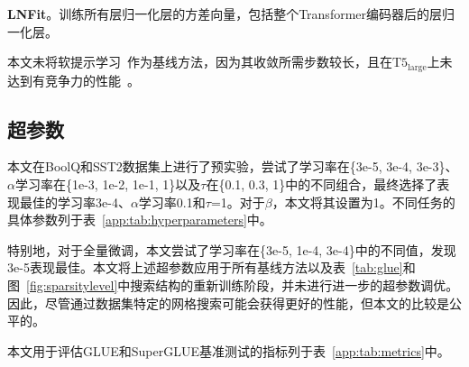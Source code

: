 \noindent\textbf{LNFit}。训练所有层归一化层的方差向量，包括整个Transformer编码器后的层归一化层。

本文未将软提示学习~\cite{lester2021power}作为基线方法，因为其收敛所需步数较长，且在$\text{T}5_{\text{large}}$上未达到有竞争力的性能~\cite{lester2021power}。


\subsection{超参数}
\label{app:hyperparameters}
本文在BoolQ和SST2数据集上进行了预实验，尝试了学习率在\{3e-5, 3e-4, 3e-3\}、$\alpha$学习率在\{1e-3, 1e-2, 1e-1, 1\}以及$\tau$在\{0.1, 0.3, 1\}中的不同组合，最终选择了表现最佳的学习率3e-4、$\alpha$学习率0.1和$\tau$=1。对于$\beta$，本文将其设置为1。不同任务的具体参数列于表~\ref{app:tab:hyperparameters}中。

特别地，对于全量微调，本文尝试了学习率在\{3e-5, 1e-4, 3e-4\}中的不同值，发现3e-5表现最佳。本文将上述超参数应用于所有基线方法以及表~\ref{tab:glue}和图~\ref{fig:sparsitylevel}中搜索结构的重新训练阶段，并未进行进一步的超参数调优。因此，尽管通过数据集特定的网格搜索可能会获得更好的性能，但本文的比较是公平的。

本文用于评估GLUE和SuperGLUE基准测试的指标列于表~\ref{app:tab:metrics}中。

